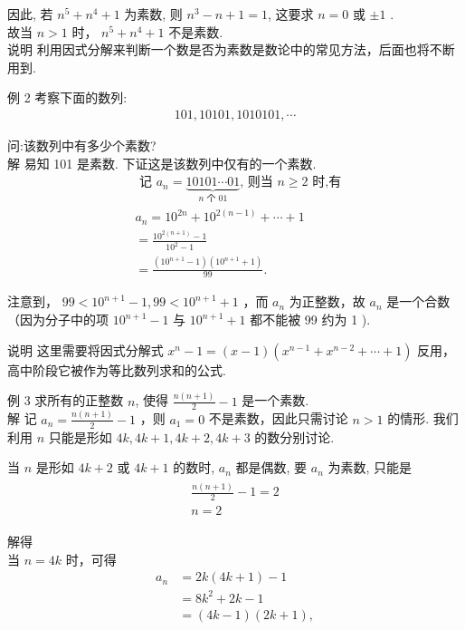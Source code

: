 因此, 若 $n^{5}+n^{4}+1$ 为素数, 则 $n^{3}-n+1=1$, 这要求 $n=0$ 或 $\pm 1$ . \\
故当 $n>1$ 时， $n^{5}+n^{4}+1$ 不是素数. \\
说明 利用因式分解来判断一个数是否为素数是数论中的常见方法，后面也将不断用到. 

例 2 考察下面的数列:\\
\begin{align*}
101,10101,1010101, \cdots
\end{align*}

问:该数列中有多少个素数?\\
解 易知 101 是素数. 下证这是该数列中仅有的一个素数. \\
\begin{align}
& \text { 记 } a_{n}=\underbrace{10101 \cdots 01}_{n \text { 个 } 01} \text {, 则当 } n \geqslant 2 \text { 时,有 } \\
& a_{n}=10^{2 n}+10^{2(n-1)}+\cdots+1 \\
& =\frac{10^{2(n+1)}-1}{10^{2}-1} \\
& =\frac{\left(10^{n+1}-1\right)\left(10^{n+1}+1\right)}{99} .
\end{align}

注意到， $99<10^{n+1}-1,99<10^{n+1}+1$ ，而 $a_{n}$ 为正整数，故 $a_{n}$ 是一个合数（因为分子中的项 $10^{n+1}-1$ 与 $10^{n+1}+1$ 都不能被 99 约为 1 ). 

说明 这里需要将因式分解式 $x^{n}-1=(x-1)\left(x^{n-1}+x^{n-2}+\cdots+1\right)$ 反用，高中阶段它被作为等比数列求和的公式. 

例 3 求所有的正整数 $n$, 使得 $\frac{n(n+1)}{2}-1$ 是一个素数.\\
解 记 $a_{n}=\frac{n(n+1)}{2}-1$ ，则 $a_{1}=0$ 不是素数，因此只需讨论 $n>1$ 的情形. 我们利用 $n$ 只能是形如 $4 k ,  4 k+1 ,  4 k+2 ,  4 k+3$ 的数分别讨论.

当 $n$ 是形如 $4 k+2$ 或 $4 k+1$ 的数时, $a_{n}$ 都是偶数, 要 $a_{n}$ 为素数, 只能是\\
\begin{align*}
\begin{gathered}
\frac{n(n+1)}{2}-1=2 \\
n=2
\end{gathered}
\end{align*}

解得\\
当 $n=4 k$ 时，可得\\
\begin{align}
a_{n} & =2 k(4 k+1)-1 \\
& =8 k^{2}+2 k-1 \\
& =(4 k-1)(2 k+1),
\end{align}

